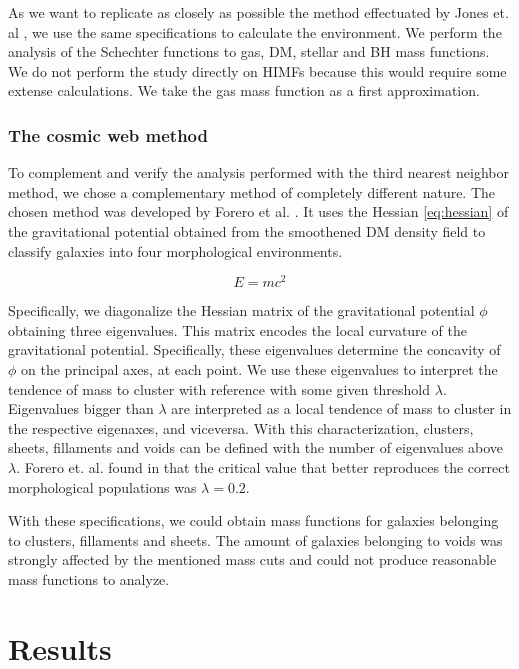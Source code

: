 \documentclass[a4paper,fleqn,usenatbib]{mnras}
\begin{document}
As we want to replicate as closely as possible the method effectuated
by Jones et. al \cite{Jones2016}, we use the same specifications to
calculate the environment. 
We perform the analysis of the Schechter functions to gas, DM, stellar and BH mass functions.
We do not perform the study directly on HIMFs because this would
require some extense calculations. We take the gas mass function as a
first approximation. 

\subsubsection{The cosmic web method}
To complement and verify the analysis performed with the third nearest
neighbor method, we chose a complementary method of completely
different nature.  
The chosen method was developed by Forero et al. \cite{Forero2009}. 
It uses the Hessian \ref{eq:hessian} of the gravitational potential
obtained from the smoothened DM density field to classify galaxies
into four morphological environments.

\begin{equation}
E =  mc^2
\label{eq:hessian}
\end{equation}

Specifically, we diagonalize the Hessian matrix of the gravitational
potential $\phi$ obtaining three eigenvalues.  
This matrix encodes the local curvature of the gravitational
potential.  
Specifically, these eigenvalues determine the concavity of $\phi$ on
the principal axes, at each point.  
We use these eigenvalues to interpret the tendence of mass to cluster
with reference with some given threshold $\lambda$.  
Eigenvalues bigger than $\lambda$ are interpreted as a local tendence
of mass to cluster in the respective eigenaxes, and viceversa.  
With this characterization, clusters, sheets, fillaments and voids can
be defined with the number of eigenvalues above $\lambda$. 
Forero et. al. found in \cite{Forero2009} that the critical value that
better reproduces the correct morphological populations was $\lambda =
0.2$. 

With these specifications, we could obtain mass functions for galaxies
belonging to clusters, fillaments and sheets. The amount of galaxies
belonging to voids was strongly affected by the mentioned mass cuts
and could not produce reasonable mass functions to analyze. 

\section{Results}
\end{document}
